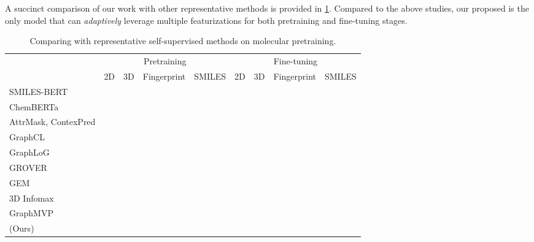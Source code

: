 A succinct comparison of our work with other representative methods is provided in \cref{tab:comparison-baseline}.
Compared to the above studies, our proposed \themodel is the only model that can \emph{adaptively} leverage multiple featurizations for both pretraining and fine-tuning stages.

\begin{table}
	\centering
	\caption{Comparing \themodel with representative self-supervised methods on molecular pretraining.}
	\begin{tabular}{l*{8}{c}}
	\toprule
	& \multicolumn{4}{c}{Pretraining} & \multicolumn{4}{c}{Fine-tuning} \\
	\cmidrule(lr){2-5} \cmidrule(lr){6-9}
	\rowcolor{white} \multirow{-2.5}{*}{Method} & 2D & 3D & Fingerprint & SMILES & 2D & 3D & Fingerprint & SMILES \\
	\midrule
	SMILES-BERT \cite{Wang:2019hp} & & & & \cmark & & & & \cmark \\
	ChemBERTa \cite{Chithrananda:2020eo} & & & & \cmark & & & & \cmark \\
	AttrMask, ContexPred \cite{Hu:2020uz} & \cmark & & & & \cmark & & & \\
	GraphCL \cite{You:2020ut} & \cmark & & & & \cmark & & & \\
	GraphLoG \cite{Xu:2021tv} & \cmark & & & & \cmark & & & \\
	GROVER \cite{Rong:2020vk} & \cmark & & & & \cmark & & & \\
	GEM \cite{Fang:2022et} & & \cmark & & & & \cmark & & \\
	3D Infomax \cite{Stark:2021ug} & \cmark & \cmark & & & \cmark & & &  \\
	GraphMVP \cite{Liu:2022vr} & \cmark & \cmark & & & \cmark & & &  \\
	\themodel (Ours) & \cmark & \cmark & \cmark & \cmark & \cmark & \cmark & \cmark & \cmark \\
	\bottomrule
	\end{tabular}
	\label{tab:comparison-baseline}
\end{table}

